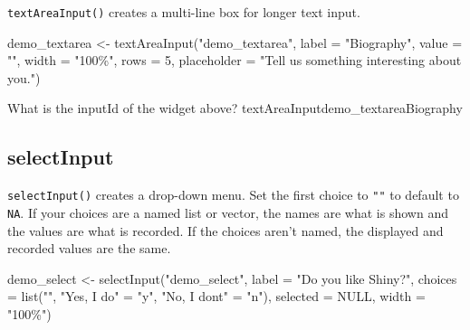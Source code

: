 \documentclass[
  oneside]{book}
\newenvironment{Shaded}{\begin{snugshade}}{\end{snugshade}}
\newcommand{\AttributeTok}[1]{\textcolor[rgb]{0.77,0.63,0.00}{#1}}
\newcommand{\ConstantTok}[1]{\textcolor[rgb]{0.00,0.00,0.00}{#1}}
\newcommand{\DecValTok}[1]{\textcolor[rgb]{0.00,0.00,0.81}{#1}}
\newcommand{\FunctionTok}[1]{\textcolor[rgb]{0.00,0.00,0.00}{#1}}
\newcommand{\NormalTok}[1]{#1}
\newcommand{\OtherTok}[1]{\textcolor[rgb]{0.56,0.35,0.01}{#1}}
\newcommand{\StringTok}[1]{\textcolor[rgb]{0.31,0.60,0.02}{#1}}
\begin{document}
\texttt{textAreaInput}\texttt{()} creates a multi-line box for longer text input.

\begin{Shaded}
\begin{Highlighting}[]
\NormalTok{demo\_textarea }\OtherTok{\textless{}{-}} 
  \FunctionTok{textAreaInput}\NormalTok{(}\StringTok{"demo\_textarea"}\NormalTok{, }
                \AttributeTok{label =} \StringTok{"Biography"}\NormalTok{, }
                \AttributeTok{value =} \StringTok{""}\NormalTok{,}
                \AttributeTok{width =} \StringTok{"100\%"}\NormalTok{,}
                \AttributeTok{rows =} \DecValTok{5}\NormalTok{, }
                \AttributeTok{placeholder =} \StringTok{"Tell us something interesting about you."}\NormalTok{)}
\end{Highlighting}
\end{Shaded}

What is the \AttributeTok{inputId} of the widget above?
textAreaInputdemo\_textareaBiography

\hypertarget{selectinput}{%
\subsection{selectInput}\label{selectinput}}

\texttt{selectInput}\texttt{()} creates a drop-down menu. Set the first \AttributeTok{choice} to \texttt{""} to default to \texttt{NA}. If your choices are a named list or vector, the names are what is shown and the values are what is recorded. If the choices aren't named, the displayed and recorded values are the same.

\begin{Shaded}
\begin{Highlighting}[]
\NormalTok{demo\_select }\OtherTok{\textless{}{-}} 
  \FunctionTok{selectInput}\NormalTok{(}\StringTok{"demo\_select"}\NormalTok{, }
              \AttributeTok{label =} \StringTok{"Do you like Shiny?"}\NormalTok{, }
              \AttributeTok{choices =} \FunctionTok{list}\NormalTok{(}\StringTok{""}\NormalTok{, }
                             \StringTok{"Yes, I do"} \OtherTok{=} \StringTok{"y"}\NormalTok{, }
                             \StringTok{"No, I don\textquotesingle{}t"} \OtherTok{=} \StringTok{"n"}\NormalTok{),}
              \AttributeTok{selected =} \ConstantTok{NULL}\NormalTok{,}
              \AttributeTok{width =} \StringTok{"100\%"}\NormalTok{)}
\end{Highlighting}
\end{Shaded}
\end{document}
